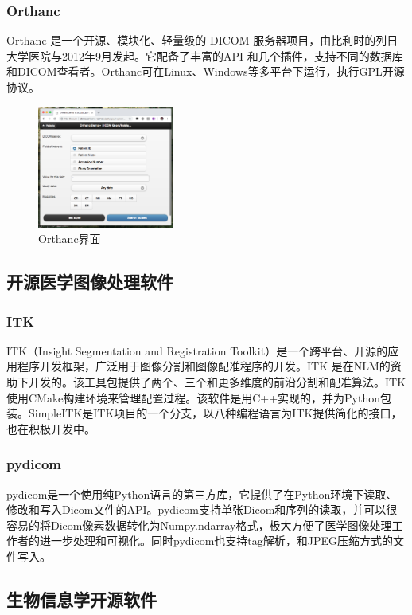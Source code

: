 \documentclass[UTF8]{ctexart}
\begin{document}
\subsubsection{Orthanc}
Orthanc 是一个开源、模块化、轻量级的 DICOM 服务器项目，由比利时的列日大学医院与2012年9月发起。它配备了丰富的API 和几个插件，支持不同的数据库和DICOM查看者。Orthanc可在Linux、Windows等多平台下运行，执行GPL开源协议。

\begin{figure}[H]
    \centering
    \includegraphics[width=0.4\textwidth]{orthanc.png}
    \caption{Orthanc界面}
    \label{fig:Orthanc}
\end{figure}


\subsection{开源医学图像处理软件}
\subsubsection{ITK}
ITK（Insight Segmentation and Registration Toolkit）是一个跨平台、开源的应用程序开发框架，广泛用于图像分割和图像配准程序的开发。ITK 是在NLM的资助下开发的。该工具包提供了两个、三个和更多维度的前沿分割和配准算法。ITK使用CMake构建环境来管理配置过程。该软件是用C++实现的，并为Python包装。SimpleITK是ITK项目的一个分支，以八种编程语言为ITK提供简化的接口，也在积极开发中。
\subsubsection{pydicom}
pydicom是一个使用纯Python语言的第三方库，它提供了在Python环境下读取、修改和写入Dicom文件的API。pydicom支持单张Dicom和序列的读取，并可以很容易的将Dicom像素数据转化为Numpy.ndarray格式，极大方便了医学图像处理工作者的进一步处理和可视化。同时pydicom也支持tag解析，和JPEG压缩方式的文件写入。

\subsection{生物信息学开源软件}
\end{document}
